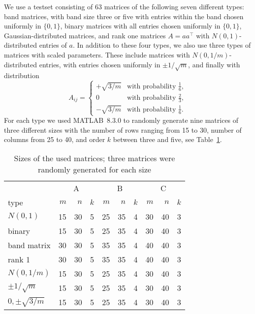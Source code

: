 \documentclass[journal]{IEEEtran}
\newcommand{\T}{^{\top}}
\begin{document}
We use a testset consisting of 63 matrices of the following seven
different types: band matrices,
with band size three or five with entries within the band chosen uniformly in $\{0,1\}$, binary matrices with all entries chosen 
uniformly in $\{0,1\}$, Gaussian-distributed matrices, and rank one 
matrices $A = aa\T$ with $N(0,1)$-distributed entries of $a$. In addition to these four types,
we also use three types of matrices with scaled parameters. These include matrices with 
$N(0, 1/m)$-distributed entries, with entries chosen uniformly in $\pm 1/\sqrt{m}$, and finally with distribution
\begin{equation}\nonumber
  A_{ij} = \begin{cases}
    + \sqrt{3/m} & \text{with probability } \frac{1}{6}, \\
    0 & \text{with probability } \frac{2}{3}, \\
    - \sqrt{3/m} & \text{with probability } \frac{1}{6}.
  \end{cases}
\end{equation}
For each type we used \mbox{MATLAB 8.3.0} to randomly generate nine
matrices of three different sizes with the number of rows ranging from 15
to 30, number of columns
from 25 to 40, and order $k$ between three and five, see Table~\ref{matrixsizes}.

\begin{table} 
 \begin{scriptsize} \caption{Sizes of the used matrices; three matrices were
 randomly generated for each size} 
 \label{matrixsizes} 
 \begin{tabular*}{\linewidth}{@{}l@{\;\;\extracolsep{\fill}}rrrrrrrrr@{}}\toprule 
  & \multicolumn{3}{c}{A} & \multicolumn{3}{c}{B} & \multicolumn{3}{c}{C} \\ 
\cmidrule(r){2-4} \cmidrule{5-7}  \cmidrule(l){8-10}
type & $m$ & $n$ & $k$ & $m$ & $n$ & $k$ & $m$ & $n$ & $k$  \\ 
\midrule 
$N(0,1)$ & 15 & 30 & 5 & 25 & 35 & 4 & 30 & 40 & 3 \\
binary & 15 & 30 & 5 & 25 & 35 & 4 & 30 & 40 & 3 \\
band matrix & 30 & 30 & 5 & 35 & 35 & 4 & 40 & 40 & 3 \\
rank 1& 30 & 30 & 5 & 35 & 35 & 4 & 40 & 40 & 3 \\
$N(0,1/m)$ & 15 & 30 & 5 & 25 & 35 & 4 & 30 & 40 & 3 \\
$\pm 1/\sqrt{m}$ & 15 & 30 & 5 & 25 & 35 & 4 & 30 & 40 & 3 \\
$0, \pm \sqrt{3/m}$ & 15 & 30 & 5 & 25 & 35 & 4 & 30 & 40 & 3 \\
\bottomrule 
 \end{tabular*} 
 \end{scriptsize} 
 \end{table} 
\end{document}
